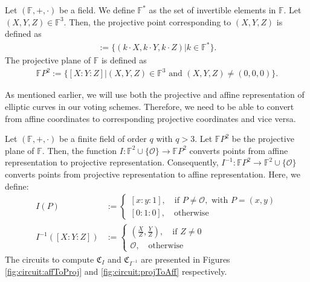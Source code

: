 \begin{definition}
    Let $(\mathbb{F}, +, \cdot)$ be a field. 
    We define $\mathbb{F}^*$ as the set of invertible elements in $\mathbb{F}$.
    Let $(X, Y, Z)\in\mathbb{F}^3$. 
    Then, the projective point corresponding to $(X, Y, Z)$ is defined as
    \begin{align*}
        [X:Y:Z] :=\{(k\cdot X, k\cdot Y, k\cdot Z)|k\in\mathbb{F}^*\}\text{.}
    \end{align*}
    The projective plane of $\mathbb{F}$ is defined as
    \begin{align*}
        \mathbb{F}P^2:=\{[X:Y:Z]|(X,Y,Z)\in\mathbb{F}^3 \text{ and } (X, Y, Z)\neq (0,0,0)\}\text{.}
    \end{align*}
\end{definition}

As mentioned earlier, we will use both the projective and affine representation of elliptic curves in our voting schemes.
Therefore, we need to be able to convert from affine coordinates to corresponding projective coordinates and vice versa.

\begin{definition}
    \label{def:coordinateTransformation}
    Let $(\mathbb{F}, +, \cdot)$ be a finite field of order $q$ with $q>3$. 
    Let $\mathbb{F}P^2$ be the projective plane of $\mathbb{F}$.
    Then, the function $I:\mathbb{F}^2\cup\{\mathcal{O}\}\to\mathbb{F}P^2$ converts points from affine representation to projective representation.
    Consequently, $I^{-1}:\mathbb{F}P^2\to\mathbb{F}^2\cup\{\mathcal{O}\}$ converts points from projective representation to affine representation.
    Here, we define:
    \begin{align*}
        I(P) &:= \begin{cases}
            [x:y:1], \quad\text{if } P\neq\mathcal{O}, \text{ with } P=(x,y)\\
            [0:1:0], \quad\text{otherwise}
        \end{cases}\\
        I^{-1}([X:Y:Z]) &:= \begin{cases}
            \left(\frac{X}{Z}, \frac{Y}{Z}\right), \quad\text{if } Z\neq 0\\
            \mathcal{O}, \quad\text{otherwise}
        \end{cases}
    \end{align*}
    The circuits to compute $\mathfrak{C}_{I}$ and $\mathfrak{C}_{I^{-1}}$ are presented in Figures \ref{fig:circuit:affToProj} and \ref{fig:circuit:projToAff} respectively.
\end{definition}

